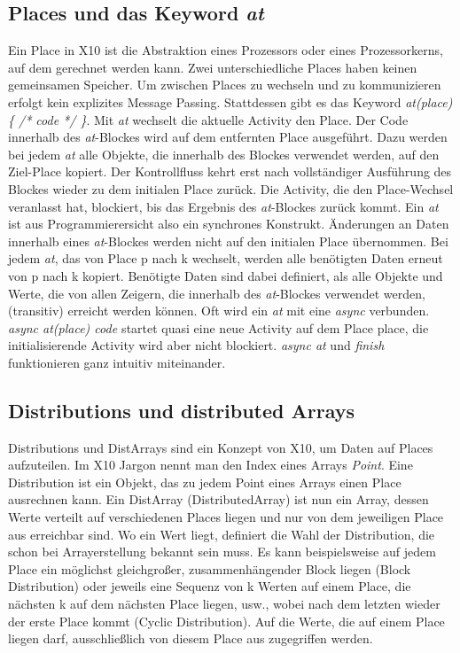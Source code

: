 \subsection{Places und das Keyword \textit{at}} %
\label{sub:places_und_das_keyword_at}
Ein Place in X10 ist die Abstraktion eines Prozessors oder eines Prozessorkerns, auf dem gerechnet werden kann. Zwei unterschiedliche Places haben keinen gemeinsamen Speicher. Um zwischen Places zu wechseln und zu kommunizieren erfolgt kein explizites Message Passing. Stattdessen gibt es das Keyword \textit{at(place) \{ /* code */ \}}. Mit \textit{at} wechselt die aktuelle Activity den Place. Der Code innerhalb des \textit{at}-Blockes wird auf dem entfernten Place ausgeführt. Dazu werden bei jedem \textit{at} alle Objekte, die innerhalb des Blockes verwendet werden, auf den Ziel-Place kopiert. Der Kontrollfluss kehrt erst nach vollständiger Ausführung des Blockes wieder zu dem initialen Place zurück. Die Activity, die den Place-Wechsel veranlasst hat, blockiert, bis das Ergebnis des \textit{at}-Blockes zurück kommt. Ein \textit{at} ist aus Programmierersicht also ein synchrones Konstrukt. Änderungen an Daten innerhalb eines \textit{at}-Blockes werden nicht auf den initialen Place übernommen. Bei jedem \textit{at}, das von Place p nach k wechselt, werden alle benötigten Daten erneut von p nach k kopiert. Benötigte Daten sind dabei definiert, als alle Objekte und Werte, die von allen Zeigern, die innerhalb des \textit{at}-Blockes verwendet werden, (transitiv) erreicht werden können. Oft wird ein \textit{at} mit eine \textit{async} verbunden. \textit{async at(place) { code }} startet quasi eine neue Activity auf dem Place place, die initialisierende Activity wird aber nicht blockiert. \textit{async at} und \textit{finish} funktionieren ganz intuitiv miteinander. \cite{x10Spec:2012:Online}

\subsection{Distributions und distributed Arrays} %
\label{sub:distributions_und_distributed_arrays}
Distributions und DistArrays sind ein Konzept von X10, um Daten auf Places aufzuteilen. Im X10 Jargon nennt man den Index eines Arrays \textit{Point}. Eine Distribution ist ein Objekt, das zu jedem Point eines Arrays einen Place ausrechnen kann. Ein DistArray (DistributedArray) ist nun ein Array, dessen Werte verteilt auf verschiedenen Places liegen und nur von dem jeweiligen Place aus erreichbar sind. Wo ein Wert liegt, definiert die Wahl der Distribution, die schon bei Arrayerstellung bekannt sein muss. Es kann beispielsweise auf jedem Place ein möglichst gleichgroßer, zusammenhängender Block liegen (Block Distribution) oder jeweils eine Sequenz von k Werten auf einem Place, die nächsten k auf dem nächsten Place liegen, usw., wobei nach dem letzten wieder der erste Place kommt (Cyclic Distribution). Auf die Werte, die auf einem Place liegen darf, ausschließlich von diesem Place aus zugegriffen werden. \cite{x10Spec:2012:Online}


